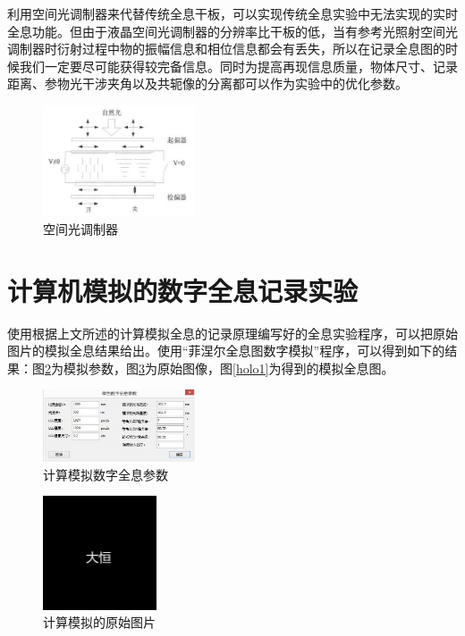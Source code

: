 \documentclass[10pt,a4paper,twocolumn,twoside,UTF8]{ctexart}
\begin{document}
	利用空间光调制器来代替传统全息干板，可以实现传统全息实验中无法实现的实时全息功能。但由于液晶空间光调制器的分辨率比干板的低，当有参考光照射空间光调制器时衍射过程中物的振幅信息和相位信息都会有丢失，所以在记录全息图的时候我们一定要尽可能获得较完备信息。同时为提高再现信息质量，物体尺寸、记录距离、参物光干涉夹角以及共轭像的分离都可以作为实验中的优化参数。
	\begin{figure}[H]
		\centering
		\includegraphics[width=0.4\textwidth]{img//yejing.jpg}
		\caption{空间光调制器}
		\label{yejing}
	\end{figure}

	\section{计算机模拟的数字全息记录实验}
		使用根据上文所述的计算模拟全息的记录原理编写好的全息实验程序，可以把原始图片的模拟全息结果给出。使用“菲涅尔全息图数字模拟”程序，可以得到如下的结果：图\ref{digpara}为模拟参数，图\ref{sample}为原始图像，图\ref{holo1}为得到的模拟全息图。

		\begin{figure}[H]
			\centering
			\includegraphics[width=0.4\textwidth]{img//eq0.jpg}
			\caption{计算模拟数字全息参数}
			\label{digpara}
		\end{figure}

		\begin{figure}[H]
			\centering
			\includegraphics[width=0.3\textwidth]{img//1.1.jpg}
			\caption{计算模拟的原始图片}
			\label{sample}
		\end{figure}
\end{document}
